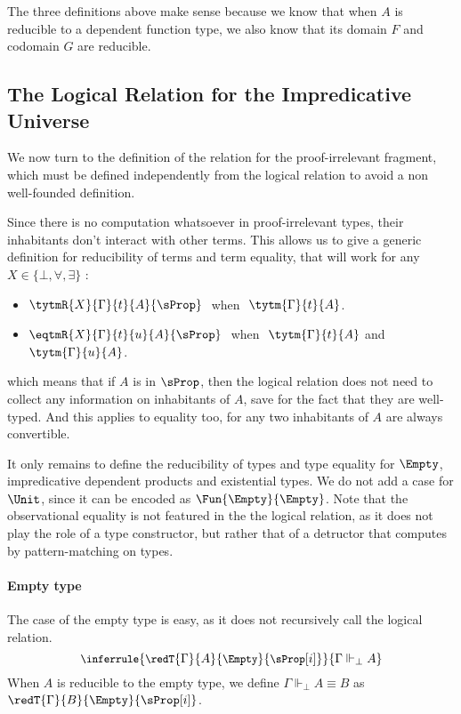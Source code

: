   The three definitions above make sense because we know that when
  $A$ is reducible to a dependent function type, we also know that its domain $F$
  and codomain $G$ are reducible.

\subsection{The Logical Relation for the Impredicative Universe}

We now turn to the definition of the relation for the proof-irrelevant
fragment, which must be defined independently from the logical relation
to avoid a non well-founded definition.

Since there is no computation whatsoever in proof-irrelevant types,
their inhabitants don't interact with other terms. This allows us
to give a generic definition for reducibility of terms and term
equality, that will work for any \( X \in \{ \bot, \forall, \exists\} \) :
%
\begin{itemize}
  \item \( \tytmR{X}{\Gamma}{t}{A}{\sProp}\ \) when \(\ \tytm{\Gamma}{t}{A} \).
  \item \( \eqtmR{X}{\Gamma}{t}{u}{A}{\sProp}\ \) when \(\ \tytm{\Gamma}{t}{A} \) and \( \tytm{\Gamma}{u}{A} \).
  \end{itemize}
%
which means that if \( A \) is in \( \sProp \), then the logical
relation does not need to collect any information on inhabitants of
\( A \), save for the fact that they are well-typed. And this applies
to equality too, for any two inhabitants of \( A \) are always
convertible.

It only remains to define the reducibility of types and type equality
for $\Empty$, impredicative dependent products and existential types.
%
We do not add a case for \( \Unit \), since it can be encoded
as \( \Fun{\Empty}{\Empty} \).
%
Note that the observational equality is not featured in the the logical
relation, as it does not play the role of a type constructor, but
rather that of a detructor that computes by pattern-matching on types.

\paragraph{Empty type}

The case of the empty type is easy, as it does not recursively call
the logical relation.
\[
{\small
  \inferrule{\redT{\Gamma}{A}{\Empty}{\sProp[i]}}
            {\Gamma \Vdash_{\bot} A}
          }\]
%
        When $A$ is reducible to the empty type, we define
        \( \Gamma \Vdash_{\bot} A \equiv B \) as \( \redT{\Gamma}{B}{\Empty}{\sProp[i]} \).


